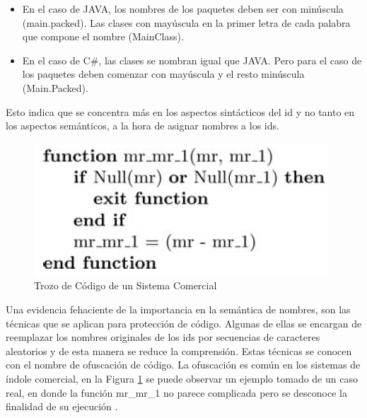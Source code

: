 \begin{itemize}
\itemsep0em%
\item En el caso de JAVA, los nombres de los paquetes deben ser con minúscula (main.packed). Las clases con mayúscula en la primer letra de cada palabra que compone el nombre (MainClass).

\item En el caso de C\#, las clases se nombran igual que JAVA. Pero para el caso de los paquetes deben comenzar con mayúscula y el resto minúscula (Main.Packed).
\end{itemize}

Esto indica que se concentra más en los aspectos sintácticos del id y no tanto en los aspectos semánticos, a la hora de asignar nombres a los ids.




\begin{figure}[t] %
\centering
\includegraphics[scale= 0.70]{./cap3/idd_1.png}
\caption{Trozo de Código de un Sistema Comercial}
\label{captura2}
\end{figure}

Una evidencia fehaciente de la importancia en la semántica de nombres, son las técnicas que se aplican para protección de código. Algunas de ellas se encargan de reemplazar los nombres originales de los ids por secuencias de caracteres aleatorios y de esta manera se reduce la comprensión. Estas técnicas se conocen con el nombre de ofuscación de código. La ofuscación es común en los sistemas de índole comercial, en la Figura \ref{captura2} se puede observar un ejemplo tomado de un caso real, en donde la función \textsf{mr\_mr\_1} no parece complicada pero se desconoce la finalidad de su ejecución \cite{DFPM05}.

